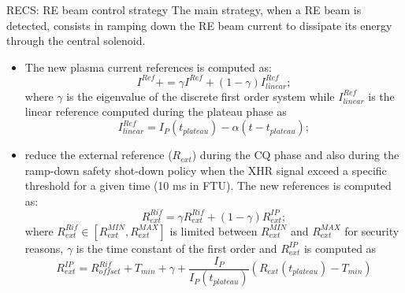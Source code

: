 \documentclass{beamer}
\begin{document}
\begin{frame}{RECS: RE beam control strategy}
	\tiny
		The main strategy, when a RE beam is detected, consists in ramping down the RE beam current to dissipate its energy through the central solenoid.
		\begin{itemize}
    		\item The new plasma current references is computed as:
            \begin{equation}
             I^{Ref} += \gamma I^{Ref} + (1-\gamma) I_{linear}^{Ref};
            \end{equation}
            where $\gamma$ is the eigenvalue of the discrete first order system while $I_{linear}^{Ref}$ is the linear reference computed during the plateau phase as 
            \begin{equation}
            I_{linear}^{Ref} = I_P(t_{plateau}) - \alpha (t-t_{plateau}); 
            \end{equation}
    		
    		
    		\item reduce the external reference ($R_{ext}$) during the CQ phase and also during the ramp-down safety shot-down policy when the XHR signal exceed a specific threshold for a given time (10 ms in FTU).
    		The new references is computed as:
            \begin{equation}
             R_{ext}^{Rif} = \gamma R_{ext}^{Rif} + (1-\gamma) R_{ext}^{IP};
            \end{equation}
            where $R_{ext}^{Rif} \in [R_{ext}^{MIN},R_{ext}^{MAX}]$ is limited between $R_{ext}^{MIN}$ and $R_{ext}^{MAX}$ for security reasons, $\gamma$ is the time constant of the first order and $R_{ext}^{IP}$ is computed as 
            \begin{equation}
             \label{eq:Rextneq}
             R_{ext}^{IP} = R_{offset}^{Rif} + T_{min} + \gamma + \frac{I_P}{I_P(t_{plateau})} (R_{ext}(t_{plateau})- T_{min})
            \end{equation}
		\end{itemize}

\end{frame}
\end{document}
